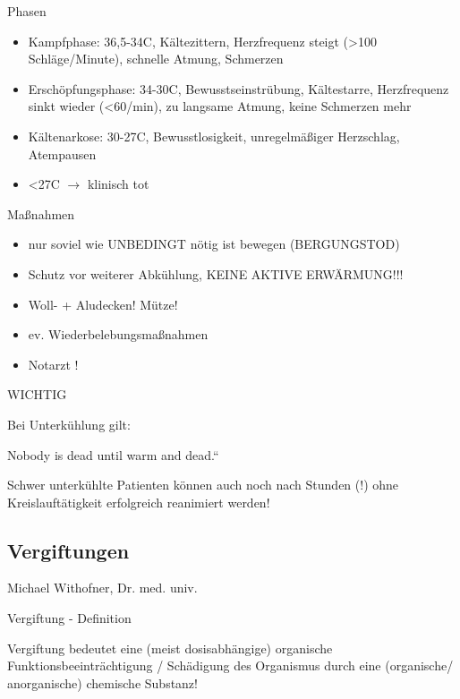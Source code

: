 \documentclass{article}
\begin{document}
Phasen

\begin{itemize}
\item Kampfphase:  36,5{\textdegree}-34{\textdegree}C, K\"altezittern,
Herzfrequenz steigt ({\textgreater}100 Schl\"age/Minute), schnelle
Atmung, Schmerzen

\item Ersch\"opfungsphase: 34{\textdegree}-30{\textdegree}C,
Bewusstseinstr\"ubung, K\"altestarre, Herzfrequenz sinkt wieder
({\textless}60/min), zu langsame Atmung, keine Schmerzen mehr

\item K\"altenarkose: 30{\textdegree}-27{\textdegree}C,
Bewusstlosigkeit, unregelm\"a{\ss}iger Herzschlag, Atempausen

\item {\textless}27{\textdegree}C ${\rightarrow}$ klinisch tot

\end{itemize}
Ma{\ss}nahmen

\begin{itemize}
\item nur soviel wie UNBEDINGT n\"otig ist  bewegen (BERGUNGSTOD)

\item Schutz vor weiterer Abk\"uhlung, KEINE AKTIVE ERW\"ARMUNG!!!

\item Woll- + Aludecken! M\"utze!

\item ev. Wiederbelebungsma{\ss}nahmen

\item Notarzt !

\end{itemize}
WICHTIG

Bei Unterk\"uhlung gilt:

{\quotedblbase}Nobody is dead until warm and dead.{\textquotedblleft}

Schwer unterk\"uhlte Patienten k\"onnen auch noch nach Stunden (!) ohne
Kreislauft\"atigkeit erfolgreich reanimiert werden!

\subsection{Vergiftungen}
Michael Withofner, Dr. med. univ.

Vergiftung - Definition

Vergiftung bedeutet eine (meist  dosisabh\"angige) organische 
Funktionsbeeintr\"achtigung / Sch\"adigung  des Organismus durch eine
(organische/ anorganische) chemische Substanz!
\end{document}
